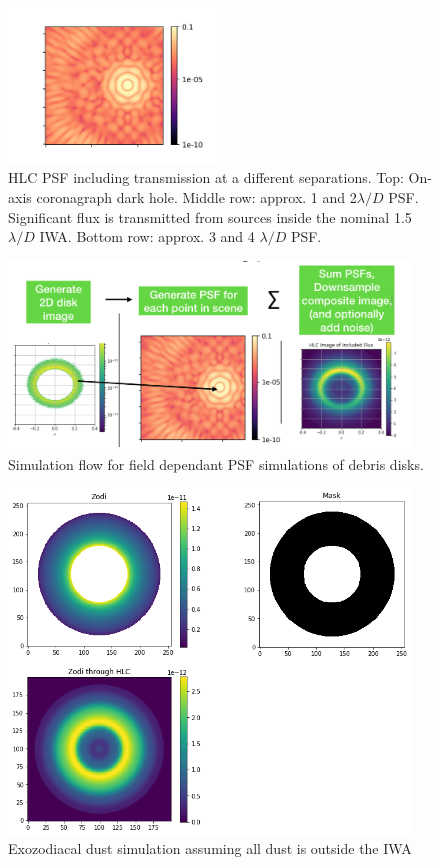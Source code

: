 \documentclass[]{spie}  %
\begin{document}
\begin{figure}
    \includegraphics[width=0.49\textwidth]{68PSF.png}
    \caption{\acrshort{HLC} \gls{PSF} including transmission at a different separations. Top: On-axis coronagraph dark hole. Middle row: approx. 1 and 2$\lambda/D$ PSF. Significant flux is transmitted from sources inside the nominal 1.5$\lambda/D$ \acrshort{IWA}. Bottom row: approx. 3 and 4 $\lambda/D$ PSF. }
    \label{fig:psfs}
\end{figure}
\begin{figure}[htbp]
    \centering
    \includegraphics[width=0.95\textwidth]{flow.png}
    \caption{Simulation flow for field dependant PSF simulations of debris disks.}
    \label{fig:flow}
\end{figure}




\begin{figure}[htbp]
    \includegraphics[width=0.95\textwidth]{Unknown-4.png}
    \caption{Exozodiacal dust simulation assuming all dust is outside the \gls{IWA} }
    \label{fig:nogap}
    \end{figure}
\end{document}
